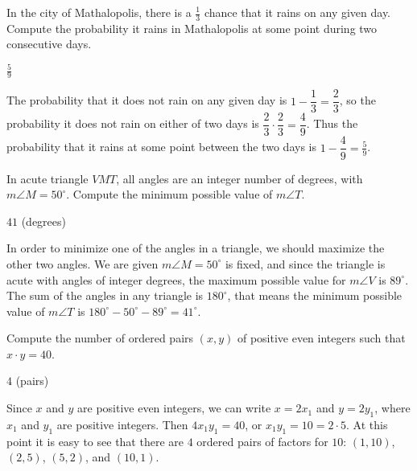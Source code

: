 \documentclass[11pt]{article}
\begin{document}
\begin{problem}%
In the city of Mathalopolis, there is a $\frac{1}{3}$ chance that it rains on any given day.
Compute the probability it rains in Mathalopolis at some point during two consecutive days.
\end{problem}

\begin{answer}
$\boxed{\frac{5}{9}}$
\end{answer}

\begin{solution}
The probability that it does not rain on any given day is $1 - \dfrac{1}{3} = \dfrac{2}{3}$,
so the probability it does not rain on either of two days is 
$\dfrac{2}{3} \cdot \dfrac{2}{3} = \dfrac{4}{9}$. Thus the probability that it rains at
some point between the two days is $1 - \dfrac{4}{9} = \boxed{\frac{5}{9}}$.
\end{solution}


\begin{problem}
In acute triangle $VMT$, all angles are an integer number of degrees, 
with $m\angle M = 50^\circ$. Compute the minimum possible value of $m\angle T$.
\end{problem}

\begin{answer}
$\boxed{41}$ (degrees)
\end{answer}

\begin{solution}
In order to minimize one of the angles in a triangle, we should maximize the other two angles. 
We are given $m\angle M = 50^\circ$ is fixed, and since the triangle is acute with angles of
integer degrees, the maximum possible value for $m\angle V$ is $89^\circ$.
The sum of the angles in any triangle is $180^\circ$, that means the minimum possible
value of $m\angle T$ is $180^\circ - 50^\circ - 89^\circ = \boxed{41^\circ}$.
\end{solution}


\begin{problem}
Compute the number of ordered pairs $(x, y)$ of positive even integers such that $x \cdot y = 40$.
\end{problem}

\begin{answer}
$\boxed{4}$ (pairs)
\end{answer}

\begin{solution}
Since $x$ and $y$ are positive even integers, we can write $x = 2x_1$ and $y = 2y_1$, where 
$x_1$ and $y_1$ are positive integers. Then $4x_1y_1 = 40$, or $x_1y_1 = 10 = 2 \cdot 5$. 
At this point it is easy to see that there are $\boxed{4}$ ordered pairs of factors for $10$:
$(1, 10)$, $(2, 5)$, $(5, 2)$, and $(10, 1)$.
\end{solution}
\end{document}
